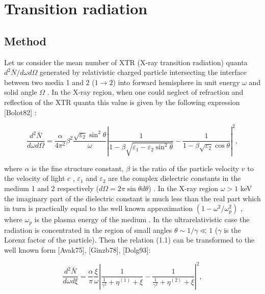 \chapter[Transition radiation]{Transition radiation}

\section{Method}


Let us consider the mean number of XTR (X-ray transition radiation) quanta 
$d^2\bar{N}/d\omega d\Omega$ generated by relativistic charged particle 
intersecting  the interface between two media 1 and 2 ($1 \rightarrow 2$) 
into forward 
hemisphere in unit energy $\omega$ and  solid angle $\Omega$ . In the 
X-ray region, when one could neglect of refraction and reflection 
of the XTR quanta this value is given by the following expression [Bolot82] :

\begin{equation}
\frac{d^2\bar{N}}{d\omega d\Omega} = 
\frac{\alpha}{4\pi^2}\beta^2
\frac{\sqrt{\varepsilon_2}\sin^2\theta}{\omega}
\left|
\frac{1}{1 - \beta\sqrt{\varepsilon_1 - \varepsilon_2\sin^2\theta}} - 
\frac{1}{1 - \beta\sqrt{\varepsilon_2}\cos\theta}
\right|^2  ,
\end{equation}

where $\alpha$ is the fine structure constant, $\beta$ is the ratio of 
the particle velocity $v$ to the velocity of light $c$ , $\varepsilon_1$  
and  $\varepsilon_2$  are the complex dielectric constants in the medium 1 
and 2  respectively ($d\Omega = 2\pi\sin\theta d\theta$) . In the X-ray 
region $\omega > 1$ keV  the imaginary part of the dielectric constant is 
much less than the real part which in turn is practically equal to the 
well known approximation $(1 - \omega^2/\omega_p^2)$  , where $\omega_p$  
is the plasma energy of the medium . In the ultrarelativistic case the 
radiation is concentrated in the region of small angles 
$\theta \sim 1/\gamma \ll 1$ 
($\gamma$ is the Lorenz factor of the particle). Then the relation (1.1) 
can be transformed to the well known form [Avak75], [Ginzb78], [Dolg93]:

\begin{equation}
\frac{d^2\bar{N}}{d\omega d\xi} = 
\frac{\alpha}{\pi}
\frac{\xi}{\omega}
\left|
\frac{1}{\frac{1}{\gamma^2} + \eta^{(1)} + \xi} - 
\frac{1}{\frac{1}{\gamma^2} + \eta^{(2)} + \xi}
\right|^2  ,
\end{equation}

